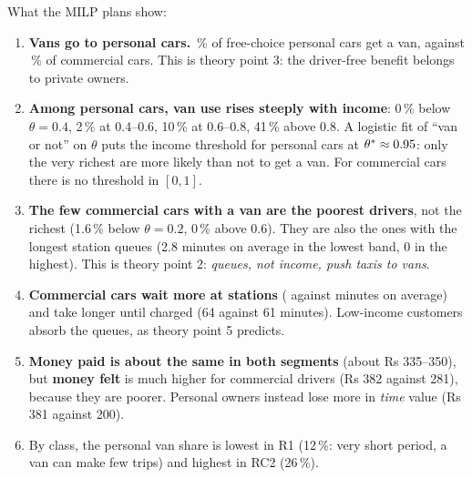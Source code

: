 \begin{table}[H]
\centering
\caption{By income band (MILP, all valid plans; van share also for RL). ``Money felt'' is the money paid times the customer's $\mu$.}

\end{table}

What the MILP plans show:
\begin{enumerate}
  \item \textbf{Vans go to personal cars.} \fvanPersMilp\,\% of free-choice personal cars get a van, against \fvanComMilp\,\% of commercial cars. This is theory point 3: the driver-free benefit belongs to private owners.
  \item \textbf{Among personal cars, van use rises steeply with income}: 0\,\% below $\theta=0.4$, 2\,\% at 0.4--0.6, 10\,\% at 0.6--0.8, 41\,\% above 0.8. A logistic fit of ``van or not'' on $\theta$ puts the income threshold for personal cars at $\theta^*\approx0.95$: only the very richest are more likely than not to get a van. For commercial cars there is no threshold in $[0,1]$.
  \item \textbf{The few commercial cars with a van are the poorest drivers}, not the richest (1.6\,\% below $\theta=0.2$, 0\,\% above 0.6). They are also the ones with the longest station queues (2.8 minutes on average in the lowest band, 0 in the highest). This is theory point 2: \emph{queues, not income, push taxis to vans}.
  \item \textbf{Commercial cars wait more at stations} (\fqueueComMilp{} against \fqueuePersMilp{} minutes on average) and take longer until charged (64 against 61 minutes). Low-income customers absorb the queues, as theory point 5 predicts.
  \item \textbf{Money paid is about the same in both segments} (about Rs 335--350), but \textbf{money felt} is much higher for commercial drivers (Rs 382 against 281), because they are poorer. Personal owners instead lose more in \emph{time} value (Rs 381 against 200).
  \item By class, the personal van share is lowest in R1 (12\,\%: very short period, a van can make few trips) and highest in RC2 (26\,\%).
\end{enumerate}



